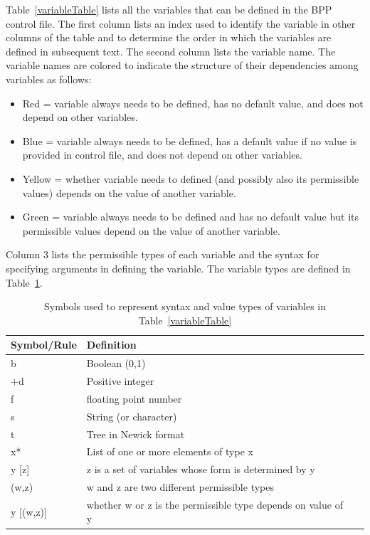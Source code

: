 \documentclass{book}
\numberwithin{equation}{section} \renewcommand{\baselinestretch}{0.55}
\begin{document}
Table~\ref{variableTable} lists all the variables that can be defined
in the BPP control file.  The first column lists an index used to
identify the variable in other columns of the table and to determine
the order in which the variables are defined in subsequent text. The
second column lists the variable name. The variable names are colored
to indicate the structure of their dependencies among variables as
follows:
\begin{itemize}
\item {\color{red} Red = variable always needs to be defined, has no
    default value, and does not depend on other variables.}
\item {\color{blue} Blue = variable always needs to be defined, has a
    default value if no value is provided in control file, and does
    not depend on other variables.}
\item {\color{yellow1} Yellow = whether variable needs to defined (and
    possibly also its permissible values) depends on the value of
    another variable.}
\item {\color{green1} Green = variable always needs to be defined and
    has no default value but its permissible values depend on the
    value of another variable.}
\end{itemize}
Column 3 lists the permissible types of each variable and the syntax
for specifying arguments in defining the variable. The variable types
are defined in Table~\ref{symbolTable}.
\begin{table}
  \begin{tabular}{@{}llr@{}}
    \toprule
    Symbol/Rule & Definition \\ \midrule
    b & Boolean (0,1) \\
    +d & Positive integer \\
    f & floating point number \\
    s & String (or character) \\
    t & Tree in Newick format \\
    x* & List of one or more elements of type x \\
    y [z] & z is a set of variables whose form is determined by y \\
    (w,z) & w and z are two different permissible types \\
    y [(w,z)] & whether w or z is the permissible type depends on value of y \\          
    \bottomrule
  \end{tabular}
  \caption{Symbols used to represent syntax and value types of
    variables in Table~\ref{variableTable}}
  \label{symbolTable}
\end{table}
\end{document}
